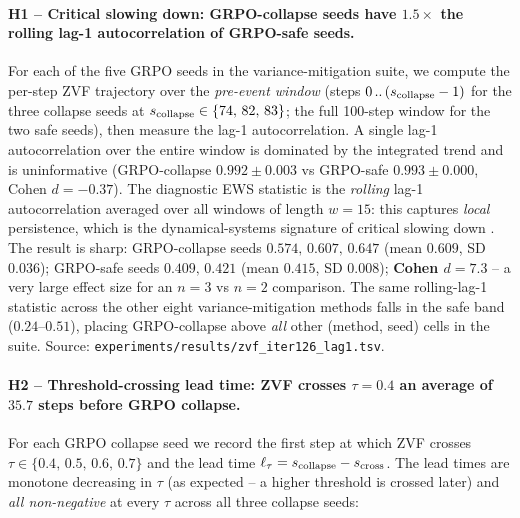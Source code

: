 \paragraph{H1 -- Critical slowing down:  GRPO-collapse seeds have
$1.5\times$ the rolling lag-1 autocorrelation of GRPO-safe seeds.}
For each of the five GRPO seeds in the variance-mitigation
suite, we compute the per-step ZVF trajectory over the
\emph{pre-event window} (steps $0\,..\,(s_{\rm collapse}-1)$ for
the three collapse seeds at $s_{\rm collapse}\in\{74,\,82,\,83\}$;
the full 100-step window for the two safe seeds), then measure
the lag-1 autocorrelation. A single lag-1 autocorrelation over
the entire window is dominated by the integrated trend and is
uninformative (GRPO-collapse $0.992\pm0.003$ vs GRPO-safe
$0.993\pm0.000$, Cohen $d=-0.37$). The diagnostic EWS statistic
is the \emph{rolling} lag-1 autocorrelation averaged over all
windows of length $w{=}15$: this captures \emph{local}
persistence, which is the dynamical-systems signature of
critical slowing down \citep{Scheffer2009}. The result is sharp:
GRPO-collapse seeds $0.574,\,0.607,\,0.647$ (mean $0.609$,
SD $0.036$); GRPO-safe seeds $0.409,\,0.421$ (mean $0.415$,
SD $0.008$); \textbf{Cohen $d = 7.3$} -- a very large effect
size for an $n{=}3$ vs $n{=}2$ comparison. The same rolling-lag-1
statistic across the other eight variance-mitigation methods
falls in the safe band ($0.24$--$0.51$), placing GRPO-collapse
above \emph{all} other (method, seed) cells in the suite. Source:
\texttt{experiments/results/zvf\_iter126\_lag1.tsv}.

\paragraph{H2 -- Threshold-crossing lead time:  ZVF crosses
$\tau{=}0.4$ an average of $35.7$ steps before GRPO collapse.}
For each GRPO collapse seed we record the first step at which
ZVF crosses $\tau\in\{0.4,\,0.5,\,0.6,\,0.7\}$ and the lead time
$\ell_\tau = s_{\rm collapse} - s_{\rm cross}$. The lead times
are monotone decreasing in $\tau$ (as expected -- a higher
threshold is crossed later) and \emph{all non-negative} at every
$\tau$ across all three collapse seeds:


